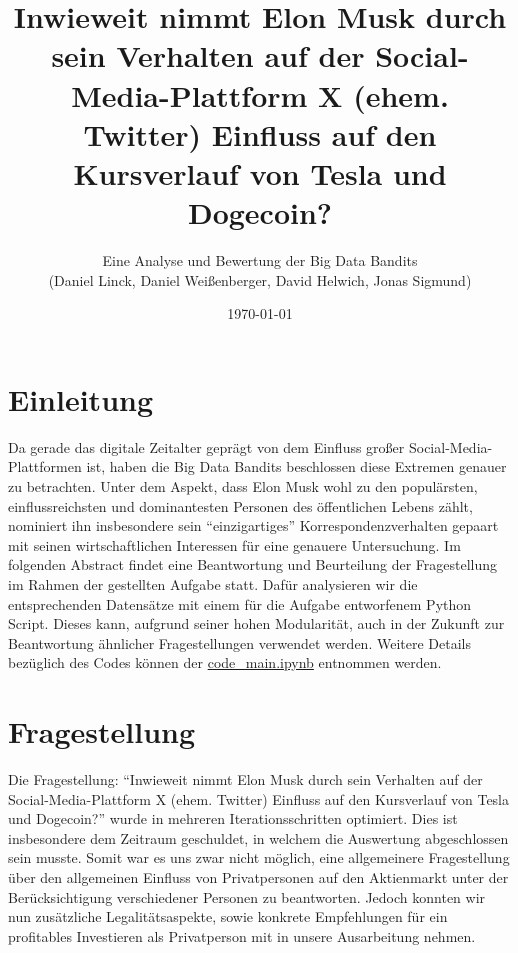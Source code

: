 \documentclass{article}
\title{\textbf {Inwieweit nimmt Elon Musk durch sein Verhalten auf der Social-Media-Plattform X (ehem. Twitter) Einfluss auf den Kursverlauf von Tesla und Dogecoin?}}
\author{Eine Analyse und Bewertung der Big Data Bandits \\ (Daniel Linck, Daniel Weißenberger, David Helwich, Jonas Sigmund)}
\date{\today}
\begin{document}
\maketitle

\tableofcontents
\newpage

\section{Einleitung}
Da gerade das digitale Zeitalter geprägt von dem Einfluss großer Social-Media-Plattformen ist, haben die Big Data Bandits beschlossen diese Extremen genauer zu betrachten.
Unter dem Aspekt, dass Elon Musk wohl zu den populärsten, einflussreichsten und dominantesten Personen des öffentlichen Lebens zählt, nominiert ihn insbesondere sein ``einzigartiges'' Korrespondenzverhalten gepaart mit seinen wirtschaftlichen Interessen für eine genauere Untersuchung.
Im folgenden Abstract findet eine Beantwortung und Beurteilung der Fragestellung im Rahmen der gestellten Aufgabe statt.
Dafür analysieren wir die entsprechenden Datensätze mit einem für die Aufgabe entworfenem Python Script.
Dieses kann, aufgrund seiner hohen Modularität, auch in der Zukunft zur Beantwortung ähnlicher Fragestellungen verwendet werden.
Weitere Details bezüglich des Codes können der \href{https://github.com/alphaname007/BigDataBandits/blob/17e158a26d8d1cc538102ff44e4171b609965e95/code\_main.ipynb}{code\_main.ipynb} entnommen werden.



\section{Fragestellung}
Die Fragestellung: ``Inwieweit nimmt Elon Musk durch sein Verhalten auf der Social-Media-Plattform X (ehem. Twitter) Einfluss auf den Kursverlauf von Tesla und Dogecoin?'' wurde in mehreren Iterationsschritten optimiert. 
Dies ist insbesondere dem Zeitraum geschuldet, in welchem die Auswertung abgeschlossen sein musste.
Somit war es uns zwar nicht möglich, eine allgemeinere Fragestellung über den allgemeinen Einfluss von Privatpersonen auf den Aktienmarkt unter der Berücksichtigung verschiedener Personen zu beantworten.
Jedoch konnten wir nun zusätzliche Legalitätsaspekte, sowie konkrete Empfehlungen für ein profitables Investieren als Privatperson mit in unsere Ausarbeitung nehmen.
\end{document}
